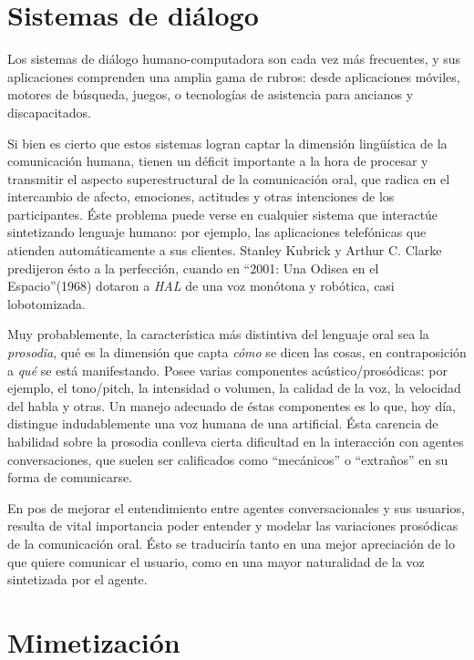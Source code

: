 \section{Sistemas de diálogo}

Los sistemas de diálogo humano-computadora son cada vez más frecuentes, y sus aplicaciones comprenden una amplia gama de rubros: desde aplicaciones móviles, motores de búsqueda, juegos, o tecnologías de asistencia para ancianos y discapacitados.


Si bien es cierto que estos sistemas logran captar la dimensión lingüística de la comunicación humana, tienen un déficit importante a la hora de procesar y transmitir el aspecto superestructural de la comunicación oral, que radica en el intercambio de afecto, emociones, actitudes y otras intenciones de los participantes. Éste problema puede verse en cualquier sistema que interactúe sintetizando lenguaje humano: por ejemplo, las aplicaciones telefónicas que atienden automáticamente a sus clientes. Stanley Kubrick y Arthur C. Clarke predijeron ésto a la perfección, cuando en ``2001: Una Odisea en el Espacio''(1968) dotaron a \emph{HAL} de una voz monótona y robótica, casi lobotomizada.

Muy probablemente, la característica más distintiva del lenguaje oral sea la \emph{prosodia}, qué es la dimensión que capta \emph{cómo} se dicen las cosas, en contraposición a \emph{qué} se está manifestando. Posee varias componentes acústico/prosódicas: por ejemplo, el tono/pitch, la intensidad o volumen, la calidad de la voz, la velocidad del habla y otras. Un manejo adecuado de éstas componentes es lo que, hoy día, distingue indudablemente una voz humana de una artificial. Ésta carencia de habilidad sobre la prosodia conlleva cierta dificultad en la interacción con agentes conversaciones, que suelen ser calificados como ``mecánicos'' o ``extraños'' en su forma de comunicarse.

En pos de mejorar el entendimiento entre agentes conversacionales y sus usuarios, resulta de vital importancia poder entender y modelar las variaciones prosódicas de la comunicación oral. Ésto se traduciría tanto en una mejor apreciación de lo que quiere comunicar el usuario, como en una mayor naturalidad de la voz sintetizada por el agente.

\section{Mimetización}

